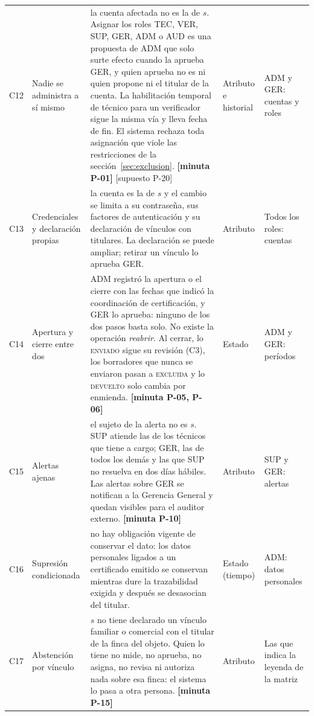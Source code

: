 \documentclass[11pt,letterpaper]{article}
\newcommand{\resp}[1]{\textrm{\footnotesize\bfseries [minuta #1]}}
\newcommand{\supu}[1]{\textrm{\footnotesize [supuesto #1]}}
\newcommand{\est}[1]{\textsc{\small #1}}
\begin{document}
{\begin{longtable}{@{}L{0.8cm} L{2.5cm} L{8.0cm} L{1.7cm} L{1.95cm}@{}}
C12 & Nadie se administra a sí mismo &
la cuenta afectada no es la de $s$. Asignar los roles TEC, VER, SUP, GER, ADM o AUD es una propuesta de
ADM que solo surte efecto cuando la aprueba GER, y quien aprueba no es ni quien propone ni el titular de
la cuenta. La habilitación temporal de técnico para un verificador sigue la misma vía y lleva fecha
de fin. El sistema rechaza toda asignación que viole las restricciones de la
sección~\ref{sec:exclusion}. \resp{P-01} \supu{P-20} &
Atributo e historial &
ADM y GER: cuentas y roles \\

C13 & Credenciales y declaración propias &
la cuenta es la de $s$ y el cambio se limita a su contraseña, sus factores de autenticación y su
declaración de vínculos con titulares. La declaración se puede ampliar; retirar un vínculo lo aprueba
GER. &
Atributo &
Todos los roles: cuentas \\

C14 & Apertura y cierre entre dos &
ADM registró la apertura o el cierre con las fechas que indicó la coordinación de certificación, y
GER lo aprueba: ninguno de los dos pasos basta solo. No existe la operación \emph{reabrir}. Al cerrar,
lo \est{enviado} sigue su revisión (C3), los borradores que nunca se enviaron pasan a \est{excluida}
y lo \est{devuelto} solo cambia por enmienda. \resp{P-05, P-06} &
Estado &
ADM y GER: períodos \\

C15 & Alertas ajenas &
el sujeto de la alerta no es $s$. SUP atiende las de los técnicos que tiene a cargo; GER, las de todos
los demás y las que SUP no resuelva en dos días hábiles. Las alertas sobre GER se notifican a la
Gerencia General y quedan visibles para el auditor externo. \resp{P-10} &
Atributo &
SUP y GER: alertas \\

C16 & Supresión condicionada &
no hay obligación vigente de conservar el dato: los datos personales ligados a un certificado emitido
se conservan mientras dure la trazabilidad exigida y después se desasocian del titular. &
Estado (tiempo) &
ADM: datos personales \\

C17 & Abstención por vínculo &
$s$ no tiene declarado un vínculo familiar o comercial con el titular de la finca del objeto. Quien
lo tiene no mide, no aprueba, no asigna, no revisa ni autoriza nada sobre esa finca: el sistema lo
pasa a otra persona. \resp{P-15} &
Atributo &
Las que indica la leyenda de la matriz \\


\end{longtable}}
\end{document}
